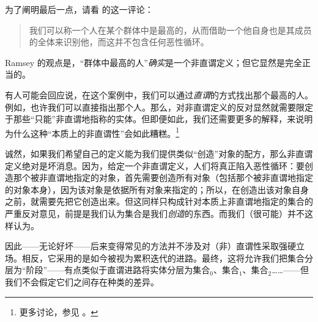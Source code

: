 \documentclass[../../../include/open-logic-section]{subfiles}
\begin{document}
为了阐明最后一点，请看 \citeauthor{Ramsey1925} 的这一评论：

\begin{quote}
	我们可以称一个人在某个群体中是最高的，从而借助一个他自身也是其成员的全体来识别他，而这并不包含任何恶性循环。 \citep{Ramsey1925}
\end{quote}

Ramsey 的观点是，“群体中最高的人”\emph{确实}是一个非直谓定义；但它显然是完全正当的。

有人可能会回应说，在这个案例中，我们可以通过\emph{直谓}的方式找出那个最高的人。例如，也许我们可以直接指出那个人。那么，对非直谓定义的反对显然就需要限定于那些“只能”非直谓地指称的实体。但即便如此，我们还需要更多的解释，来说明为什么这种“本质上的非直谓性”会如此糟糕。\footnote{更多讨论，参见 \citet{Linnebo2010}。}

诚然，如果我们希望自己的定义能为我们提供类似“创造”对象的配方，那么非直谓定义绝对是坏消息。因为，给定一个非直谓定义，人们将真正陷入恶性循环：要创造那个被非直谓地指定的对象，首先需要创造所有对象（包括那个被非直谓地指定的对象本身），因为该对象是依据所有对象来指定的；所以，在创造出该对象自身之前，就需要先把它创造出来。但这同样只构成针对本质上非直谓地指定的集合的严重反对意见，前提是我们认为集合是我们\emph{创造}的东西。而我们（很可能）并不这样认为。

因此——无论好坏——后来变得常见的方法并不涉及对（非）直谓性采取强硬立场。相反，它采用的是如今被视为累积迭代的进路。最终，这将允许我们把集合分层为“阶段”——有点类似于直谓进路将实体分层为集合$_0$、集合$_1$、集合$_2$……——但我们不会假定它们之间存在种类的差异。
\end{document}
